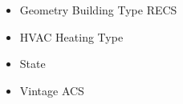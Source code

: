 \begin{itemize}
\item Geometry Building Type RECS
\item HVAC Heating Type
\item State
\item Vintage ACS
\end{itemize}
